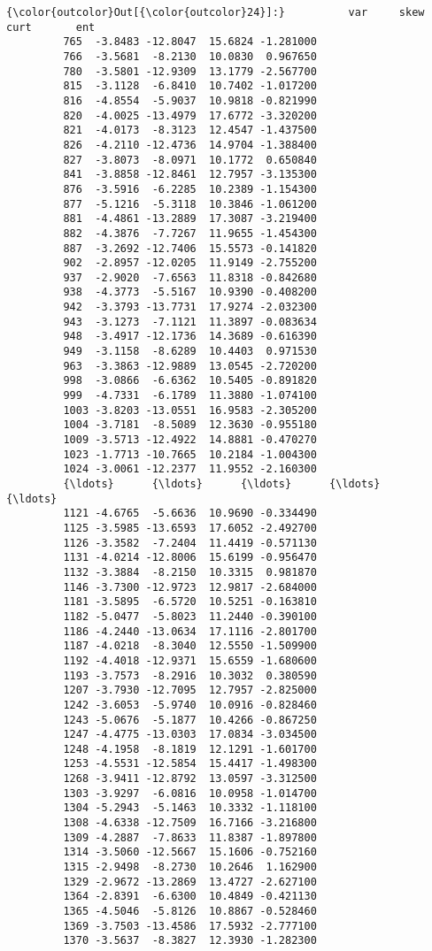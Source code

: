 \documentclass[11pt]{article}
\begin{document}
            \begin{Verbatim}[commandchars=\\\{\}]
{\color{outcolor}Out[{\color{outcolor}24}]:}          var     skew     curt       ent
         765  -3.8483 -12.8047  15.6824 -1.281000
         766  -3.5681  -8.2130  10.0830  0.967650
         780  -3.5801 -12.9309  13.1779 -2.567700
         815  -3.1128  -6.8410  10.7402 -1.017200
         816  -4.8554  -5.9037  10.9818 -0.821990
         820  -4.0025 -13.4979  17.6772 -3.320200
         821  -4.0173  -8.3123  12.4547 -1.437500
         826  -4.2110 -12.4736  14.9704 -1.388400
         827  -3.8073  -8.0971  10.1772  0.650840
         841  -3.8858 -12.8461  12.7957 -3.135300
         876  -3.5916  -6.2285  10.2389 -1.154300
         877  -5.1216  -5.3118  10.3846 -1.061200
         881  -4.4861 -13.2889  17.3087 -3.219400
         882  -4.3876  -7.7267  11.9655 -1.454300
         887  -3.2692 -12.7406  15.5573 -0.141820
         902  -2.8957 -12.0205  11.9149 -2.755200
         937  -2.9020  -7.6563  11.8318 -0.842680
         938  -4.3773  -5.5167  10.9390 -0.408200
         942  -3.3793 -13.7731  17.9274 -2.032300
         943  -3.1273  -7.1121  11.3897 -0.083634
         948  -3.4917 -12.1736  14.3689 -0.616390
         949  -3.1158  -8.6289  10.4403  0.971530
         963  -3.3863 -12.9889  13.0545 -2.720200
         998  -3.0866  -6.6362  10.5405 -0.891820
         999  -4.7331  -6.1789  11.3880 -1.074100
         1003 -3.8203 -13.0551  16.9583 -2.305200
         1004 -3.7181  -8.5089  12.3630 -0.955180
         1009 -3.5713 -12.4922  14.8881 -0.470270
         1023 -1.7713 -10.7665  10.2184 -1.004300
         1024 -3.0061 -12.2377  11.9552 -2.160300
         {\ldots}      {\ldots}      {\ldots}      {\ldots}       {\ldots}
         1121 -4.6765  -5.6636  10.9690 -0.334490
         1125 -3.5985 -13.6593  17.6052 -2.492700
         1126 -3.3582  -7.2404  11.4419 -0.571130
         1131 -4.0214 -12.8006  15.6199 -0.956470
         1132 -3.3884  -8.2150  10.3315  0.981870
         1146 -3.7300 -12.9723  12.9817 -2.684000
         1181 -3.5895  -6.5720  10.5251 -0.163810
         1182 -5.0477  -5.8023  11.2440 -0.390100
         1186 -4.2440 -13.0634  17.1116 -2.801700
         1187 -4.0218  -8.3040  12.5550 -1.509900
         1192 -4.4018 -12.9371  15.6559 -1.680600
         1193 -3.7573  -8.2916  10.3032  0.380590
         1207 -3.7930 -12.7095  12.7957 -2.825000
         1242 -3.6053  -5.9740  10.0916 -0.828460
         1243 -5.0676  -5.1877  10.4266 -0.867250
         1247 -4.4775 -13.0303  17.0834 -3.034500
         1248 -4.1958  -8.1819  12.1291 -1.601700
         1253 -4.5531 -12.5854  15.4417 -1.498300
         1268 -3.9411 -12.8792  13.0597 -3.312500
         1303 -3.9297  -6.0816  10.0958 -1.014700
         1304 -5.2943  -5.1463  10.3332 -1.118100
         1308 -4.6338 -12.7509  16.7166 -3.216800
         1309 -4.2887  -7.8633  11.8387 -1.897800
         1314 -3.5060 -12.5667  15.1606 -0.752160
         1315 -2.9498  -8.2730  10.2646  1.162900
         1329 -2.9672 -13.2869  13.4727 -2.627100
         1364 -2.8391  -6.6300  10.4849 -0.421130
         1365 -4.5046  -5.8126  10.8867 -0.528460
         1369 -3.7503 -13.4586  17.5932 -2.777100
         1370 -3.5637  -8.3827  12.3930 -1.282300
         

\end{Verbatim}
\end{document}
